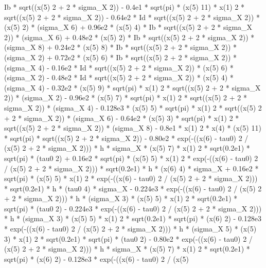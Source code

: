 \begin{maplegroup}
Ib * sqrt((x(5)  2 + 2 * sigma\_X  2)) - 0.4e1 * sqrt(pi) * (x(5)  11) * x(1)  2 * sqrt((x(5)  2 + 2 * sigma\_X  2)) - 0.64e2 * Id * sqrt((x(5)  2 + 2 * sigma\_X  2)) * (x(5)  2) * (sigma\_X  6) + 0.96e2 * (x(5)  4) * Ib * sqrt((x(5)  2 + 2 * sigma\_X  2)) * (sigma\_X  6) + 0.48e2 * (x(5)  2) * Ib * sqrt((x(5)  2 + 2 * sigma\_X  2)) * (sigma\_X  8) + 0.24e2 * (x(5)  8) * Ib * sqrt((x(5)  2 + 2 * sigma\_X  2)) * (sigma\_X  2) + 0.72e2 * (x(5)  6) * Ib * sqrt((x(5)  2 + 2 * sigma\_X  2)) * (sigma\_X  4) - 0.16e2 * Id * sqrt((x(5)  2 + 2 * sigma\_X  2)) * (x(5)  6) * (sigma\_X  2) - 0.48e2 * Id * sqrt((x(5)  2 + 2 * sigma\_X  2)) * (x(5)  4) * (sigma\_X  4) - 0.32e2 * (x(5)  9) * sqrt(pi) * x(1)  2 * sqrt((x(5)  2 + 2 * sigma\_X  2)) * (sigma\_X 2) - 0.96e2 * (x(5)  7) * sqrt(pi) * x(1)  2 * sqrt((x(5)  2 + 2 * sigma\_X  2)) * (sigma\_X  4) - 0.128e3 * (x(5)  5) * sqrt(pi) * x(1)  2 * sqrt((x(5)  2 + 2 * sigma\_X  2)) * (sigma\_X  6) - 0.64e2 * (x(5)  3) * sqrt(pi) * x(1)  2 * sqrt((x(5) 2 + 2 * sigma\_X  2)) * (sigma\_X  8) - 0.8e1 * x(1)  2 * x(4) * (x(5)  11) * sqrt(pi) * sqrt((x(5)  2 + 2 * sigma\_X  2)) - 0.80e2 * exp(-((x(6) - tau0)  2 / (x(5)  2 + 2 * sigma\_X  2))) * h * sigma\_X * (x(5)  7) * x(1)  2 * sqrt(0.2e1) * sqrt(pi) * (tau0  2) + 0.16e2 * sqrt(pi) * (x(5)  5) * x(1)  2 * exp(-((x(6) - tau0)  2 / (x(5)  2 + 2 * sigma\_X  2))) * sqrt(0.2e1) * h * (x(6)  4) * sigma\_X + 0.16e2 * sqrt(pi) * (x(5)  5) * x(1)  2 * exp(-((x(6) - tau0)  2 / (x(5)  2 + 2 * sigma\_X 2))) * sqrt(0.2e1) * h * (tau0  4) * sigma\_X - 0.224e3 * exp(-((x(6) - tau0)  2 / (x(5)  2 + 2 * sigma\_X  2))) * h * (sigma\_X  3) * (x(5)  5) * x(1)  2 * sqrt(0.2e1) * sqrt(pi) * (tau0  2) - 0.224e3 * exp(-((x(6) - tau0)  2 / (x(5)  2 + 2 * sigma\_X  2))) * h * (sigma\_X  3) * (x(5)  5) * x(1)  2 * sqrt(0.2e1) * sqrt(pi) * (x(6)  2) - 0.128e3 * exp(-((x(6) - tau0)  2 / (x(5)  2 + 2 * sigma\_X  2))) * h * (sigma\_X  5) * (x(5)  3) * x(1)  2 * sqrt(0.2e1) * sqrt(pi) * (tau0  2) - 0.80e2 * exp(-((x(6) - tau0)  2 / (x(5)  2 + 2 * sigma\_X  2))) * h * sigma\_X * (x(5)  7) * x(1)  2 * sqrt(0.2e1) * sqrt(pi) * (x(6)  2) - 0.128e3 * exp(-((x(6) - tau0)  2 / (x(5) 
\end{maplegroup}
